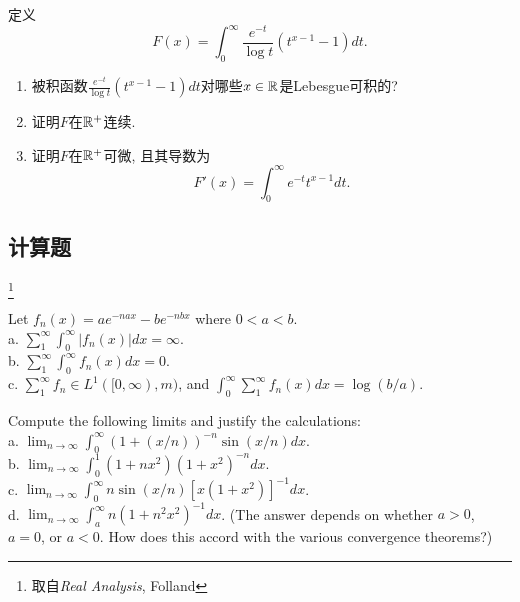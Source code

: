 
\begin{exercise}
定义
$$F(x)=\int_0^{\infty} \frac{e^{-t}}{\log t}\left(t^{x-1}-1\right)dt.$$
\begin{enumerate}
    \item 被积函数$\frac{e^{-t}}{\log t}\left(t^{x-1}-1\right)dt$对哪些$x \in \mathbb{R}$是Lebesgue可积的?
    \item 证明$F$在$\mathbb{R}^+$连续.
    \item 证明$F$在$\mathbb{R}^+$可微, 且其导数为
    $$F'(x)=\int_0^{\infty} e^{-t} t^{x-1} dt.$$
\end{enumerate}
\end{exercise}


\subsection{计算题}\footnote{取自\textit{Real Analysis}, Folland}
\begin{exercise}
    Let $f_n(x)=a e^{-n a x}-b e^{-n b x}$ where $0<a<b$. \\
    a. $\sum_1^{\infty} \int_0^{\infty}\left|f_n(x)\right| d x=\infty$. \\
    b. $\sum_1^{\infty} \int_0^{\infty} f_n(x) d x=0$. \\
    c. $\sum_1^{\infty} f_n \in L^1([0, \infty), m)$, and $\int_0^{\infty} \sum_1^{\infty} f_n(x) d x=\log (b / a)$.
\end{exercise}
\begin{exercise}
    Compute the following limits and justify the calculations: \\
    a. $\lim _{n \rightarrow \infty} \int_0^{\infty}(1+(x / n))^{-n} \sin (x / n) d x$. \\
    b. $\lim _{n \rightarrow \infty} \int_0^1\left(1+n x^2\right)\left(1+x^2\right)^{-n} d x$. \\
    c. $\lim _{n \rightarrow \infty} \int_0^{\infty} n \sin (x / n)\left[x\left(1+x^2\right)\right]^{-1} d x$. \\
    d. $\lim _{n \rightarrow \infty} \int_a^{\infty} n\left(1+n^2 x^2\right)^{-1} d x$. (The answer depends on whether $a>0$, $a=0$, or $a<0$. How does this accord with the various convergence theorems?)
\end{exercise}

